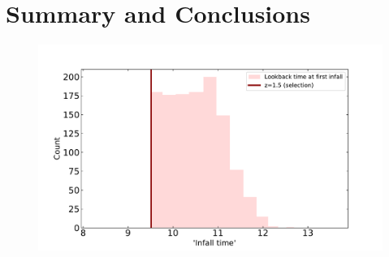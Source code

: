 \documentclass[twocolumn]{aastex631}
\begin{document}
\section{Summary and Conclusions}













\begin{figure}[htb]
    \centering
    \includegraphics[width=\columnwidth]{plots/5_define-beginning/countvsinfalltime.pdf}
    \caption{}
\end{figure}









{}

\end{document}
